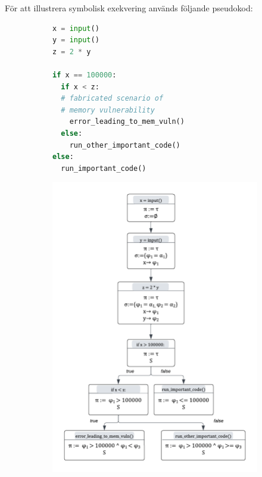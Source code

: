 För att illustrera symbolisk exekvering används följande pseudokod:

\begin{figure}[H]
  \begin{subfigure}[b]{0.58\textwidth}
    \begin{lstlisting}[language=Python, frame=single, basicstyle=\small]
x = input()
y = input()
z = 2 * y

if x == 100000:
  if x < z:
  # fabricated scenario of
  # memory vulnerability
    error_leading_to_mem_vuln()
  else:
    run_other_important_code()
else:
  run_important_code()
\end{lstlisting}
    \caption{} %
    \label{fig:symbex_example_code}
  \end{subfigure}
  \hspace*{\fill}
  \begin{subfigure}[t]{0.5\textwidth}
    \centering
    \includegraphics[scale=0.38]{figures/final_symbolic_example_graph.png}

\end{subfigure}
\end{figure}
